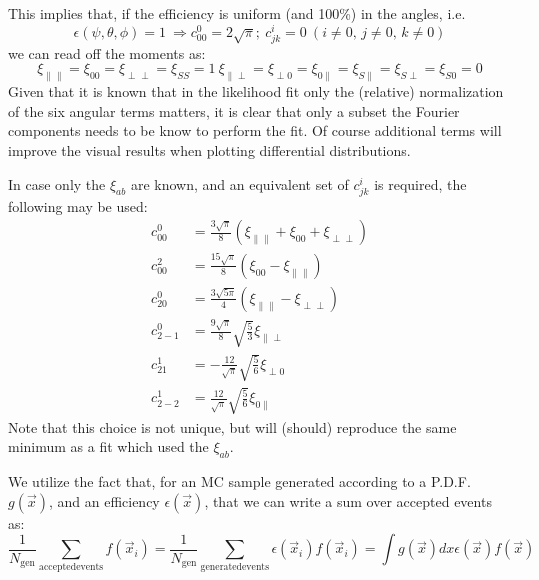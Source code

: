 This implies that, if the efficiency is uniform (and 100\%) in the angles, i.e.
\begin{equation}
   \epsilon(\psi,\theta,\phi) = 1\
   \Rightarrow c^0_{00} = 2\sqrt{\pi};\ c^{i}_{jk} = 0\ (i\neq 0,\,j\neq 0,\,k \neq 0)
\end{equation}
we can read off the moments as:
\begin{equation}
    \xi_{\parallel\parallel} = \xi_{00}= \xi_{\perp\perp} = \xi_{SS} = 1\
    \xi_{\parallel\perp} =\xi_{\perp 0} = \xi_{0\parallel} =\xi_{S \parallel}
      = \xi_{S \perp} = \xi_{S 0} = 0
\end{equation}
Given that it is known that in the likelihood fit only the (relative) normalization of the six
angular terms matters, it is clear that only a subset the Fourier components needs to be know to
perform the fit. Of course additional terms will improve the visual results when plotting
differential distributions.

In case only the $\xi_{ab}$ are known, and an equivalent set of $c^i_{jk}$ is required, the 
following may be used:
\begin{align}
 c^0_{00}  &= \frac{3\sqrt{\pi}}{8}( \xi_{\parallel \parallel }+\xi_{00}+\xi_{\perp\perp} )     \\
 c^2_{00}  &= \frac{15\sqrt{\pi}}{8}( \xi_{00} - \xi_{\parallel \parallel } )    \\
 c^0_{20}  &= \frac{3\sqrt{5\pi}}{4} ( \xi_{\parallel \parallel } - \xi_{\perp\perp} )    \\
 c^0_{2-1} &= \frac{9\sqrt{\pi}}{8}\sqrt{\frac{5}{3}}  \xi_{\parallel \perp}    \\
 c^1_{21}  &= - \frac{12}{\sqrt{\pi}}\sqrt{\frac{5}{6}} \xi_{\perp0}    \\
 c^1_{2-2} &= \frac{12}{\sqrt{\pi}}\sqrt{\frac{5}{6}}  \xi_{0\parallel }
\end{align}
Note that this choice is not unique, but will (should)  reproduce the same minimum as a fit which
used the $\xi_{ab}$.




We utilize the fact that, for an MC sample generated according to a P.D.F. $g(\vec{x})$,
and an efficiency $\epsilon(\vec{x})$, that we can write a sum over accepted events as:
\begin{equation}
  \frac{1}{N_{\mathrm{gen}}} \sum_{\mathrm{accepted events}}
    f(\vec{x}_i) = \frac{1}{N_{\mathrm{gen}}}
    \sum_{\mathrm{generated events}} \epsilon(\vec{x}_i) f(\vec{x}_i)
  = \int g(\vec{x})dx \epsilon(\vec{x}) f(\vec{x})
\end{equation}

